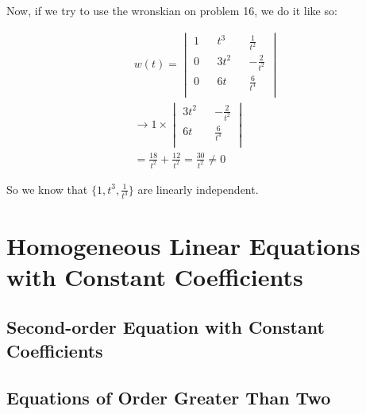  Now, if we try to use the wronskian on problem 16, we do it like so:

  \begin{align}
    w(t)=
    \begin{vmatrix}
      1&&t^3&&\frac{1}{t^2}\\
      0&&3t^2&&-\frac{2}{t^2}\\
      0&&6t&&\frac{6}{t^4}\\
    \end{vmatrix}\\
    \to 1\times
    \begin{vmatrix}
      3t^2&&-\frac{2}{t^2}\\
      6t&&\frac{6}{t^4}\\
    \end{vmatrix}\\
    =\frac{18}{t^2}+\frac{12}{t^2}=\frac{30}{t^2}\neq0
  \end{align}

  So we know that $\{1,t^3,\frac{1}{t^3}\}$ are linearly independent. 

\section{Homogeneous Linear Equations with Constant Coefficients}

  \subsection{Second-order Equation with Constant Coefficients}

  \subsection{Equations of Order Greater Than Two}
